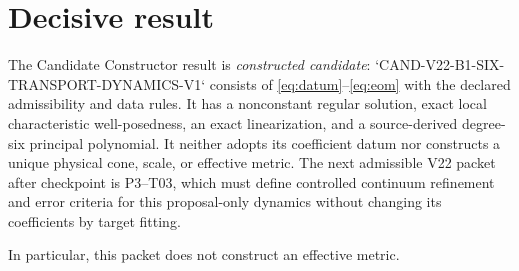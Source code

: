 \documentclass[11pt]{article}
\begin{document}
\section{Decisive result}

The Candidate Constructor result is \emph{constructed candidate}:
`CAND-V22-B1-SIX-TRANSPORT-DYNAMICS-V1` consists of
\eqref{eq:datum}--\eqref{eq:eom} with the declared admissibility and data
rules.  It has a nonconstant regular solution, exact local characteristic
well-posedness, an exact linearization, and a source-derived degree-six
principal polynomial.  It neither adopts its coefficient datum nor constructs
a unique physical cone, scale, or effective metric.  The next admissible V22
packet after checkpoint is P3--T03, which must define controlled continuum
refinement and error criteria for this proposal-only dynamics without changing
its coefficients by target fitting.

In particular, this packet does not construct an effective metric.
\end{document}
